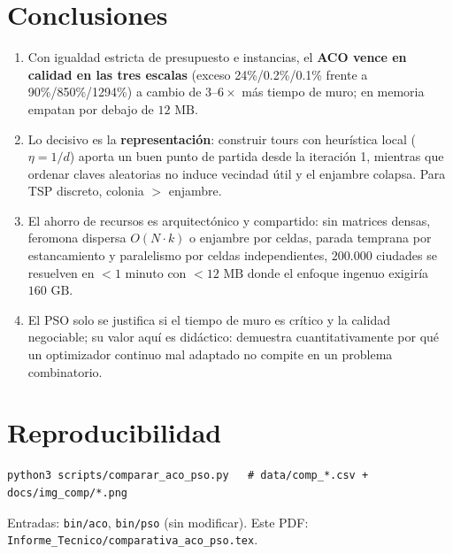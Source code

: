 \documentclass[11pt,a4paper]{article}
\begin{document}
\section{Conclusiones}
\begin{enumerate}
\item Con igualdad estricta de presupuesto e instancias, el \textbf{ACO vence en calidad en las tres escalas} (exceso 24\%/0.2\%/0.1\% frente a 90\%/850\%/1294\%) a cambio de $3$--$6\times$ más tiempo de muro; en memoria empatan por debajo de $12\text{ MB}$.
\item Lo decisivo es la \textbf{representación}: construir tours con heurística local ($\eta=1/d$) aporta un buen punto de partida desde la iteración 1, mientras que ordenar claves aleatorias no induce vecindad útil y el enjambre colapsa. Para TSP discreto, colonia $>$ enjambre.
\item El ahorro de recursos es arquitectónico y compartido: sin matrices densas, feromona dispersa $O(N{\cdot}k)$ o enjambre por celdas, parada temprana por estancamiento y paralelismo por celdas independientes, $200.000$ ciudades se resuelven en $<1$ minuto con $<12\text{ MB}$ donde el enfoque ingenuo exigiría $160\text{ GB}$.
\item El PSO solo se justifica si el tiempo de muro es crítico y la calidad negociable; su valor aquí es didáctico: demuestra cuantitativamente por qué un optimizador continuo mal adaptado no compite en un problema combinatorio.
\end{enumerate}

\section*{Reproducibilidad}
\begin{verbatim}
python3 scripts/comparar_aco_pso.py   # data/comp_*.csv + docs/img_comp/*.png
\end{verbatim}
Entradas: \texttt{bin/aco}, \texttt{bin/pso} (sin modificar). Este PDF: \texttt{Informe\_Tecnico/comparativa\_aco\_pso.tex}.
\end{document}
